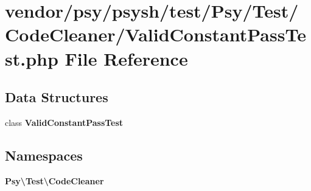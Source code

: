 \section{vendor/psy/psysh/test/\+Psy/\+Test/\+Code\+Cleaner/\+Valid\+Constant\+Pass\+Test.php File Reference}
\label{_valid_constant_pass_test_8php}
\subsection*{Data Structures}
\begin{DoxyCompactItemize}
\item 
class {\bf Valid\+Constant\+Pass\+Test}
\end{DoxyCompactItemize}
\subsection*{Namespaces}
\begin{DoxyCompactItemize}
\item 
 {\bf Psy\textbackslash{}\+Test\textbackslash{}\+Code\+Cleaner}
\end{DoxyCompactItemize}
